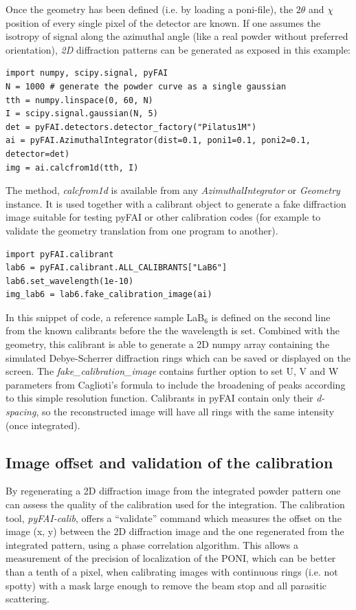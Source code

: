 \documentclass[preprint]{iucr}
\begin{document}
Once the geometry has been defined (i.e. by loading a poni-file), the $2\theta$
and $\chi$ position of every single pixel of the detector are known.
If one assumes the isotropy of signal along the azimuthal angle (like a real
powder without preferred orientation), \textit{2D} diffraction patterns can be
generated as exposed in this example:

\begin{verbatim}
import numpy, scipy.signal, pyFAI
N = 1000 # generate the powder curve as a single gaussian
tth = numpy.linspace(0, 60, N)
I = scipy.signal.gaussian(N, 5)
det = pyFAI.detectors.detector_factory("Pilatus1M")
ai = pyFAI.AzimuthalIntegrator(dist=0.1, poni1=0.1, poni2=0.1, detector=det)
img = ai.calcfrom1d(tth, I)
\end{verbatim}


The method, \textit{calcfrom1d} is available from any
\textit{AzimuthalIntegrator} or \textit{Geometry} instance.
It is used together with a calibrant object to generate a fake diffraction image
suitable for testing pyFAI or other calibration codes (for example to validate
the geometry translation from one program to another).


\begin{verbatim}
import pyFAI.calibrant
lab6 = pyFAI.calibrant.ALL_CALIBRANTS["LaB6"]
lab6.set_wavelength(1e-10)
img_lab6 = lab6.fake_calibration_image(ai)
\end{verbatim}

In this snippet of code, a reference sample LaB$_6$ is defined on the second
line from the known calibrants before the the wavelength is set.
Combined with the geometry, this calibrant is able to
generate a 2D numpy array containing the simulated Debye-Scherrer diffraction
rings which can be saved or displayed on the screen.
The \textit{fake\_calibration\_image} contains further option to set U, V and W
parameters from Caglioti's formula \cite{caglioti} to include the
broadening of peaks according to this simple resolution function.
Calibrants in pyFAI contain only their \textit{d-spacing}, so the
reconstructed image will have all rings with the same
intensity (once integrated).

\subsection{Image offset and validation of the calibration}
By regenerating a 2D diffraction image from the integrated powder pattern one
can assess the quality of the calibration used for the integration.
The calibration tool, \textit{pyFAI-calib}, offers  a ``validate'' command which
measures the offset on the image (x, y) between the 2D diffraction image and the
one regenerated from the integrated pattern, using a phase correlation
algorithm.
This allows a measurement of the precision of localization of the PONI, which
can be better than a tenth of a pixel, when calibrating images with continuous
rings (i.e. not spotty) with a mask large enough to remove the beam stop and
all parasitic scattering.
\end{document}
